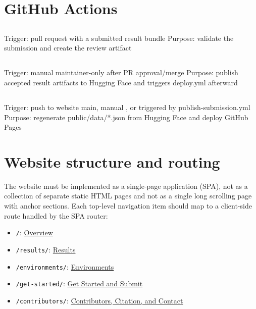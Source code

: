 \documentclass[11pt]{article}
\begin{document}
\section{GitHub Actions}
\subsection*{}
   Trigger: pull request with a submitted result bundle
   Purpose: validate the submission and create the review artifact
\subsection*{}
  Trigger: manual maintainer-only  after PR approval/merge
  Purpose: publish accepted result artifacts to Hugging Face and triggers deploy.yml afterward
\subsection*{}
  Trigger: push to website main, manual , or triggered by publish-submission.yml
  Purpose: regenerate public/data/*.json from Hugging Face and deploy GitHub Pages

\label{sec:website-routing}
\section*{Website structure and routing}

The website must be implemented as a single-page application (SPA), not as a collection of separate static HTML pages and not as a single long scrolling page with anchor sections.
Each top-level navigation item should map to a client-side route handled by the SPA router:

\begin{itemize}
    \item \texttt{/}: \hyperref[sec:website-page-overview]{Overview}
    \item \texttt{/results/}: \hyperref[sec:website-page-results]{Results}
    \item \texttt{/environments/}: \hyperref[sec:website-page-environments]{Environments}
    \item \texttt{/get-started/}: \hyperref[sec:website-page-get-started]{Get Started and Submit}
    \item \texttt{/contributors/}: \hyperref[sec:website-page-contributors]{Contributors, Citation, and Contact}
\end{itemize}
\end{document}
